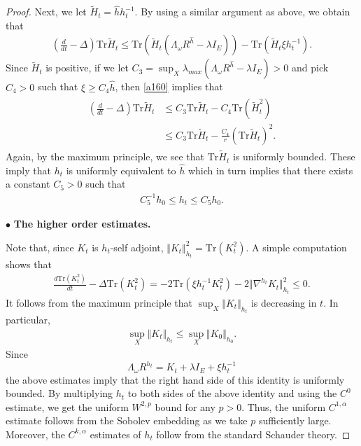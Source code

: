 \documentclass[11pt]{amsart}
\numberwithin{equation}{section}
\theoremstyle{remark}
\newcommand{\wt}{\widetilde}
\newcommand{\lb}{\left (}
\newcommand{\rb}{\right )}
\newcommand{\ga}{\alpha}
\newcommand{\tr}{\text{Tr}}
\begin{document}
\begin{proof}
Next, we let $\wt H_t=\hat h h_t^{-1}$. By using a similar argument as above, we obtain that
\begin{eqnarray}\label{a160}
\lb \frac{d}{dt}-\Delta\rb\tr \wt H_t\leq\tr \lb \wt H_t \lb\Lambda_\omega R^{\hat h}-\lambda I_E\rb\rb-\tr\lb \wt H_t\xi
 h_t^{-1}\rb.
\end{eqnarray}
Since $\wt H_t$ is positive,  if we let $C_3=\sup_X \lambda_{max}\lb \Lambda_\omega R^{\hat h}-\lambda I_E\rb>0$ and pick $C_4>0$ such that $\xi\geq C_4 \hat h$, then \eqref{a160} implies that
\begin{align*}
\begin{split}
\lb \frac{d}{dt}-\Delta\rb\tr \wt H_t & \leq C_3 \tr \wt H_t-C_4 \tr\lb \wt H_t^2\rb \\
& \leq C_3 \tr \wt H_t-\frac{C_4}{r} \lb \tr \wt H_t\rb^2.
\end{split}
\end{align*}
Again, by the maximum principle,  we see that $\tr\wt H_t$ is uniformly bounded. These imply that $h_t$ is uniformly equivalent to $\hat h$ which in turn implies that there exists a constant $C_5>0$ such that
\begin{eqnarray}\label{a170}
C_5^{-1}h_0\leq h_t\leq C_5 h_0.
\end{eqnarray}

\medskip

\noindent $\bullet$ \textbf{The higher order estimates.}

\smallskip
Note that, since $K_t$ is $h_t$-self adjoint, $\Vert K_t\Vert_{h_t}^2=\tr\lb K_t^2\rb$. A simple computation shows that
\begin{eqnarray}\label{a200}
\frac{d \tr\lb K_t^2\rb}{dt}-\Delta \tr\lb K_t^2\rb=-2\tr \lb \xi h_t^{-1}K_t^2\rb-2 \Vert \nabla^{h_t}K_t \Vert_{h_t}^2\leq 0.
\end{eqnarray}
It follows from the maximum principle that $\sup_X \Vert K_t\Vert_{h_t}$ is decreasing in $t$. In particular,
\smallskip
\begin{eqnarray}\label{a300}
\sup_X \Vert K_t\Vert_{h_t}\leq \sup_X \Vert K_0\Vert_{h_0}.
\end{eqnarray}
Since
\[
\Lambda_\omega R^{h_t}=K_t+\lambda I_E+ \xi  h_t^{-1}
\]
the above estimates imply that the right hand side of this identity is uniformly bounded.
By multiplying $h_t$ to both sides of the above identity and using the $C^0$ estimate, we get the uniform $W^{2,p}$ bound for any $p>0$. Thus, the uniform $C^{1, \ga}$ estimate follows from the Sobolev embedding as we take $p$ sufficiently large.
Moreover, the $C^{k,\ga}$ estimates of $h_t$ follow from the standard Schauder theory.


\end{proof}
\end{document}
